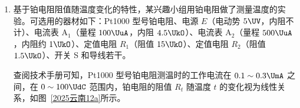 \documentclass[\gkver]{gaokaozhenti}
\begin{document}
\begin{enumerate}
完成下列填空：
\begin{enumerate}
\item
表格中 a 处的数据为 （保留 3 位有效数字）；
\item
其它条件不变时，在实验误差允许的范围内，滑动摩擦力的大小与接触面上压力的大小 ，$\mu$ 与接触面上压力的大小 （以上两空填“成正比”“成反比”或“无关”）；
\item
若在实验过程中未进行步骤②，实验装置如图~\ref{2025云南11b}所示，挂钩高于定滑轮，则 $\mu$ 的测量结果将 （填“偏大”“偏小”或“不变”）。
\end{enumerate}



\item
基于铂电阻阻值随温度变化的特性，某兴趣小组用铂电阻做了测量温度的实验。可选用的器材如下：Pt1000 型号铂电阻、电源 $E$（电动势 $5 \UV$，内阻不计）、电流表 A$_{1}$（量程 $100 \UuA$，内阻 $4.5 \UkO$）、电流表 A$_{2}$（量程 $500 \UuA$，内阻约 $1 \UkO$）、定值电阻 $R_{1}$（阻值 $15 \UkO$）、定值电阻 $R_{2}$（阻值 $1.5 \UkO$）、开关 S 和导线若干。

查阅技术手册可知，Pt1000 型号铂电阻测温时的工作电流在 $0.1 \sim 0.3 \UmA$ 之间，在 $0 \sim 100\UdC$ 范围内，铂电阻的阻值 $R_{t}$ 随温度 $t$ 的变化视为线性关系，如图~\ref{2025云南12a}所示。


\end{enumerate}
\end{document}
